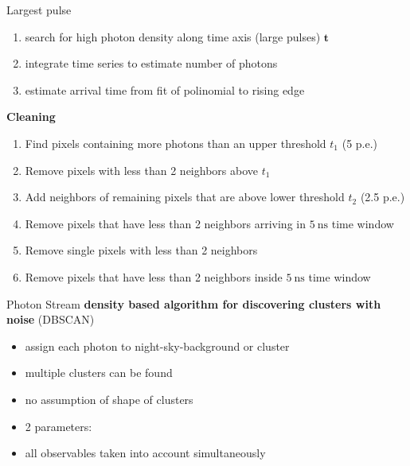 \begin{frame}{Largest pulse}
  \begin{enumerate}
    \item search for high photon density along time axis (large pulses) $\mathbf{t}$
    \item integrate time series to estimate number of photons
    \item estimate arrival time from fit of polinomial to rising edge
  \end{enumerate}
  \vfill
  {\Large \textbf{Cleaning}}
  \begin{enumerate}
    \item Find pixels containing more photons than an upper threshold $t_1$ (5 p.e.)
    \item Remove pixels with less than 2 neighbors above $t_1$
    \item Add neighbors of remaining pixels that are above lower threshold $t_2$ (2.5 p.e.)
    \item Remove pixels that have less than 2 neighbors arriving in $\SI{5}{\nano\second}$ time window
    \item Remove single pixels with less than 2 neighbors
    \item Remove pixels that have less than 2 neighbors inside $\SI{5}{\nano\second}$ time window
  \end{enumerate}
\end{frame}

\begin{frame}{Photon Stream}
  \textbf{density based algorithm for discovering clusters with noise} (DBSCAN)
  \begin{itemize}
    \item assign each photon to night-sky-background or cluster
    \item multiple clusters can be found
    \item no assumption of shape of clusters
    \item 2 parameters:
    \item all observables taken into account simultaneously
  \end{itemize}
\end{frame}

